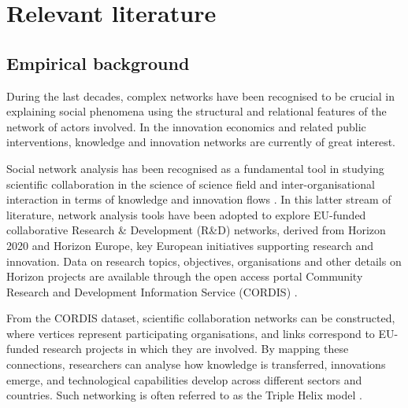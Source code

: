 \documentclass[11pt]{article}
\begin{document}
\section{Relevant literature}\label{sec:background}

\subsection{Empirical background}

During the last decades, complex networks have been recognised to be crucial in explaining social phenomena using the structural and relational features of the network of actors involved. %
In the innovation economics and related public interventions, knowledge and innovation networks are currently of great interest.

Social network analysis has been recognised as a fundamental tool in studying scientific collaboration in the science of science field \citep{liu2023data,fortunato2018science} and inter\hyp{}organisational interaction in terms of knowledge and innovation flows \citep{terwal}. 
In this latter stream of literature, network analysis tools have been adopted to explore EU-funded collaborative Research \& Development (R\&D) networks, derived from Horizon 2020 and Horizon Europe, key European initiatives supporting research and innovation. 
Data on research topics, objectives, organisations and other details on Horizon projects are available through the open access portal Community Research and Development Information Service (CORDIS) \citep{EuropeanCommissionCordis:Results}.

From the CORDIS dataset, scientific collaboration networks can be constructed, where vertices represent participating organisations, and links correspond to EU-funded research projects in which they are involved. By mapping these connections, researchers can analyse how knowledge is transferred, innovations emerge, and technological capabilities develop across different sectors and countries. Such networking is often referred to as the Triple Helix model \citep{etzkowitz1995triple}.
\end{document}
